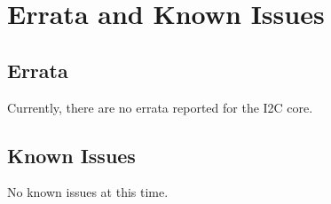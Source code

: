 \section{Errata and Known Issues}

\subsection{Errata}
Currently, there are no errata reported for the I2C core. 

\subsection{Known Issues}
No known issues at this time.
